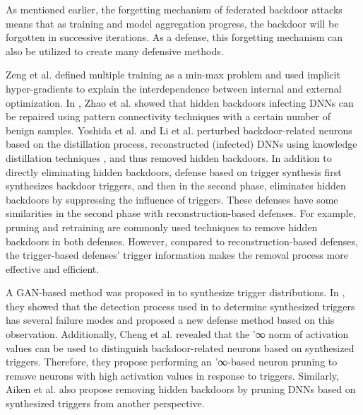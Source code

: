 \documentclass[conference]{IEEEtran}
\begin{document}
As mentioned earlier, the forgetting mechanism of federated backdoor attacks means that as training and model aggregation progress,
the backdoor will be forgotten in successive iterations. As a defense, this forgetting mechanism can also be utilized to create many defensive methods.

Zeng et al. \cite{b90}defined multiple training as a min-max problem and used implicit hyper-gradients to
explain the interdependence between internal and external optimization.
In \cite{b91}, Zhao et al. showed that hidden backdoors infecting DNNs can be repaired using pattern connectivity techniques with a certain number of benign samples.
Yoshida et al.  and Li et al. \cite{b92} perturbed backdoor-related neurons based on the distillation process, reconstructed (infected) DNNs using knowledge
distillation techniques , and thus removed hidden backdoors.
In addition to directly eliminating hidden backdoors, defense based on trigger synthesis first
synthesizes backdoor triggers, and then in the second phase, eliminates hidden backdoors by suppressing the influence of triggers.
These defenses have some similarities in the second phase with reconstruction-based defenses. For example,
pruning and retraining are commonly used techniques to remove hidden backdoors in both defenses. However,
compared to reconstruction-based defenses, the trigger-based defenses' trigger information makes the removal process more effective and efficient.

A GAN-based method was proposed in \cite{b93} to synthesize trigger distributions.
In \cite{b94}, they showed that the detection process used in \cite{b95} to determine synthesized
triggers has several failure modes and proposed a new defense method based on this observation.
Additionally, Cheng et al. \cite{b96} revealed that the '∞ norm of activation values can be used to
distinguish backdoor-related neurons based on synthesized triggers. Therefore, they propose performing an
'∞-based neuron pruning to remove neurons with high activation values in response to triggers.
Similarly, Aiken et al.\cite{b97} also propose removing hidden backdoors
by pruning DNNs based on synthesized triggers from another perspective.
\end{document}
